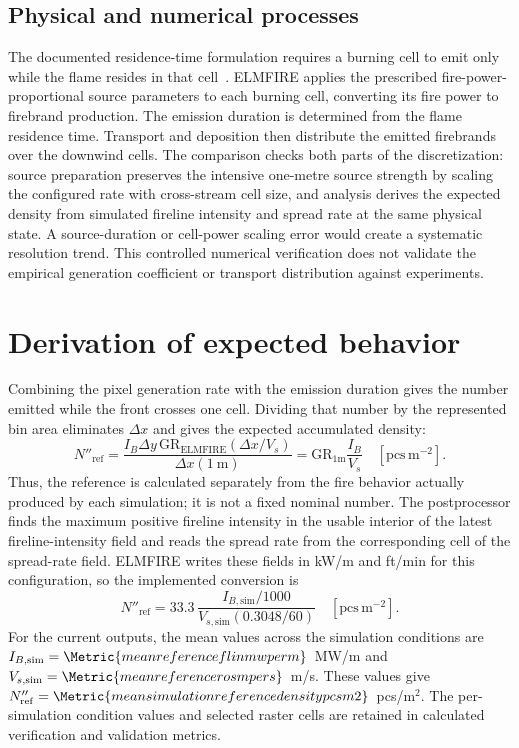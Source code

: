 \subsection{Physical and numerical processes}

The documented residence-time formulation requires a burning cell to emit only
while the flame resides in that cell~\cite{Qin2025}.
ELMFIRE applies the prescribed fire-power-proportional source parameters to
each burning cell, converting its fire power to firebrand production. The
emission duration is determined from the flame residence time. Transport and
deposition then distribute the emitted firebrands over the downwind cells.
The comparison checks both parts of the discretization: source preparation
preserves the intensive one-metre source strength by scaling the configured
rate with cross-stream cell size, and analysis derives the expected density
from simulated fireline intensity and spread rate at the same physical state.
A source-duration or cell-power scaling error would create a systematic
resolution trend. This controlled numerical verification does not validate
the empirical generation coefficient or transport distribution against experiments.

\section{Derivation of expected behavior}
Combining the pixel generation rate with the emission duration gives the
number emitted while the front crosses one cell. Dividing that number by the
represented bin area eliminates $\Delta x$ and gives the expected accumulated
density:
\[
  N''_{\mathrm{ref}}
  =\frac{I_B\Delta y\,\mathrm{GR}_{\mathrm{ELMFIRE}}
          (\Delta x/V_s)}{\Delta x(1~\mathrm{m})}
  =\mathrm{GR}_{1\mathrm{m}}\frac{I_B}{V_s}
  \quad [\mathrm{pcs\,m^{-2}}].
\]
Thus, the reference is calculated separately from the fire behavior actually
produced by each simulation; it is not a fixed nominal number. The
postprocessor finds the maximum positive fireline intensity in the usable
interior of the latest fireline-intensity field and reads the spread rate from
the corresponding cell of the spread-rate field. ELMFIRE writes these fields
in kW/m and ft/min for this configuration, so the implemented conversion is
\[
  N''_{\mathrm{ref}}
  =33.3\,\frac{I_{B,\mathrm{sim}}/1000}
                    {V_{s,\mathrm{sim}}(0.3048/60)}
  \quad [\mathrm{pcs\,m^{-2}}].
\]
For the current outputs, the mean values across the simulation conditions are
$I_{B,\mathrm{sim}}=\Metric{meanreferenceflinmwperm}$~MW/m and
$V_{s,\mathrm{sim}}=\Metric{meanreferencerosmpers}$~m/s. These values give
$N''_{\mathrm{ref}}=\Metric{meansimulationreferencedensitypcsm2}$~pcs/m$^2$.
The per-simulation condition values and selected raster cells are retained in
calculated verification and validation metrics.

